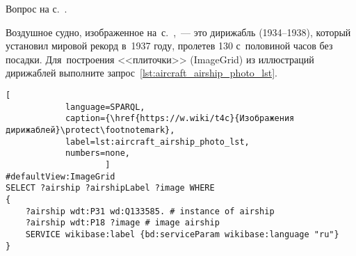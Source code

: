 %
\begin{task}
    \label{answer:aircraft_question_airship_2}
    \AnswerBackref Вопрос на с.~\pageref{fig:airship_question_aircraft}.

Воздушное судно, 
    изображенное на~с.~\pageref{fig:airship_question_aircraft},~--- 
    это дирижабль  (1934--1938), 
    который установил мировой рекорд в~1937 году, 
    пролетев 130 с~половиной часов без посадки.
    Для~построения <<плиточки>> (ImageGrid) из иллюстраций дирижаблей 
    выполните запрос~\ref{lst:aircraft_airship_photo_lst}.
    
	\begin{lstlisting}[ 
            language=SPARQL, 
            caption={\href{https://w.wiki/t4c}{Изображения дирижаблей}\protect\footnotemark}, 
            label=lst:aircraft_airship_photo_lst, 
            numbers=none,
                    ]
#defaultView:ImageGrid
SELECT ?airship ?airshipLabel ?image WHERE
{
    ?airship wdt:P31 wd:Q133585. # instance of airship
  	?airship wdt:P18 ?image # image airship
    SERVICE wikibase:label {bd:serviceParam wikibase:language "ru"}
}
\end{lstlisting}
\end{task}







\hfil{}\hfil%
\newpage

